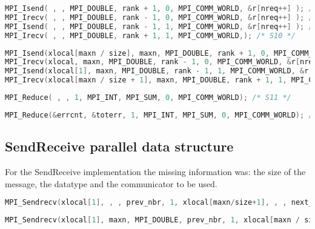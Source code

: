 \documentclass[a4paper, 10pt]{article}
\begin{document}
    \begin{lstlisting}[language=c, caption={Template S7, S8, S9, S10}]
MPI_Isend( , , MPI_DOUBLE, rank + 1, 0, MPI_COMM_WORLD, &r[nreq++] ); /* S7 */
MPI_Irecv( , , MPI_DOUBLE, rank - 1, 0, MPI_COMM_WORLD, &r[nreq++] ); /* S8 */
MPI_Isend( , , MPI_DOUBLE, rank - 1, 1, MPI_COMM_WORLD, &r[nreq++] ); /* S9 */
MPI_Irecv( , , MPI_DOUBLE, rank + 1, 1, MPI_COMM_WORLD,); /* S10 */
    \end{lstlisting}

    \begin{lstlisting}[language=c, caption={Correct S7, S8, S9, S10}]
MPI_Isend(xlocal[maxn / size], maxn, MPI_DOUBLE, rank + 1, 0, MPI_COMM_WORLD, &r[nreq++]); /* S7 */
MPI_Irecv(xlocal, maxn, MPI_DOUBLE, rank - 1, 0, MPI_COMM_WORLD, &r[nreq++]); /* S8 */
MPI_Isend(xlocal[1], maxn, MPI_DOUBLE, rank - 1, 1, MPI_COMM_WORLD, &r[nreq++]); /* S9 */
MPI_Irecv(xlocal[maxn / size + 1], maxn, MPI_DOUBLE, rank + 1, 1, MPI_COMM_WORLD, &r[nreq++]); /* S10 */
    \end{lstlisting}

    \begin{lstlisting}[language=c, caption={Template S11}]
MPI_Reduce( , , 1, MPI_INT, MPI_SUM, 0, MPI_COMM_WORLD); /* S11 */
    \end{lstlisting}

    \begin{lstlisting}[language=c, caption={Correct S11}]
MPI_Reduce(&errcnt, &toterr, 1, MPI_INT, MPI_SUM, 0, MPI_COMM_WORLD); /* S11 */
    \end{lstlisting}

\subsection{SendReceive parallel data structure}

    For the SendReceive implementation the missing information was: the size of the message, the datatype and the communicator to be used.

    \begin{lstlisting}[language=c, caption={Template S12}]
MPI_Sendrecv(xlocal[1], , , prev_nbr, 1, xlocal[maxn/size+1], , , next_nbr, 1, , status);   /* S12 */
    \end{lstlisting}

    \begin{lstlisting}[language=c, caption={Correct S12}]
MPI_Sendrecv(xlocal[1], maxn, MPI_DOUBLE, prev_nbr, 1, xlocal[maxn / size + 1], maxn, MPI_DOUBLE, next_nbr, 1, MPI_COMM_WORLD, &status); /* S12 */
    \end{lstlisting}
\end{document}
